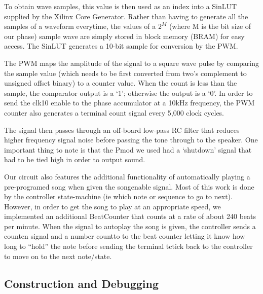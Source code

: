 \documentclass{article}
\begin{document}
    To obtain wave samples, this value is then used as an index into a SinLUT supplied by the Xilinx Core Generator. Rather than having to generate all the samples of a waveform everytime, the values of a $2^M$ (where M is the bit size of our phase) sample wave are simply stored in block memory (BRAM) for easy access. The SinLUT generates a 10-bit sample for conversion by the PWM.

    The PWM maps the amplitude of the signal to a square wave pulse by comparing the sample value (which needs to be first converted from two's complement to unsigned offset binary) to a counter value. When the count is less than the sample, the comparator output is a `1'; otherwise the output is a `0'. In order to send the clk10 enable to the phase accumulator at a 10kHz frequency, the PWM counter also generates a terminal count signal every 5,000 clock cycles. 

    The signal then passes through an off-board low-pass RC filter that reduces higher frequency signal noise before passing the tone through to the speaker. One important thing to note is that the Pmod we used had a `shutdown' signal that had to be tied high in order to output sound.

    Our circuit also features the additional functionality of automatically playing a pre-programed song when given the song\textunderscore enable signal. Most of this work is done by the controller state-machine (ie which note or sequence to go to next). However, in order to get the song to play at an appropriate speed, we implemented an additional BeatCounter that counts at a rate of about 240 beats per minute. When the signal to autoplay the song is given, the controller sends a count\textunderscore en signal and a number count\textunderscore to to the beat counter letting it know how long to ``hold'' the note before sending the terminal tc\textunderscore tick back to the controller to move on to the next note/state.

  \subsection{Construction and Debugging}

\end{document}
